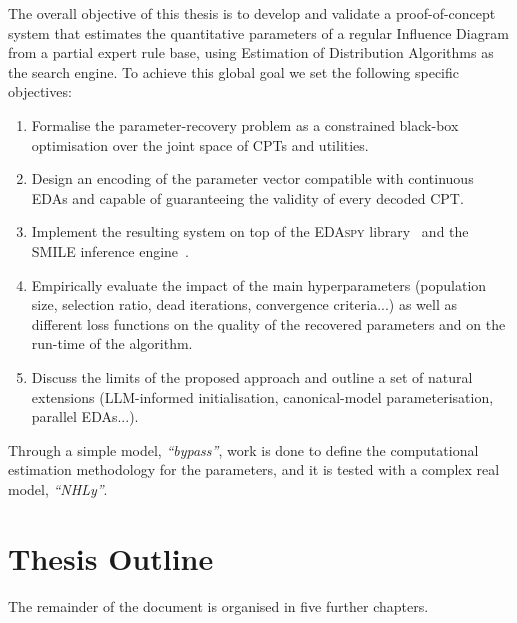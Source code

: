 The overall objective of this thesis is to develop and validate a
proof-of-concept system that estimates the quantitative parameters of
a regular Influence Diagram from a partial expert rule base, using
Estimation of Distribution Algorithms as the search engine. To
achieve this global goal we set the following specific objectives:
\begin{enumerate}
    \item Formalise the parameter-recovery problem as a constrained
          black-box optimisation over the joint space of CPTs and
          utilities.
    \item Design an encoding of the parameter vector compatible with
          continuous EDAs and capable of guaranteeing the validity of
          every decoded CPT.
    \item Implement the resulting system on top of the
          \textsc{EDAspy} library~\cite{soloviev2024edaspy} and the
          \textsc{SMILE} inference engine~\cite{genie}.
    \item Empirically evaluate the impact of the main
          hyperparameters (population size, selection ratio, dead iterations, convergence criteria...) as well as different loss functions on the quality of the recovered parameters and
          on the run-time of the algorithm.
    \item Discuss the limits of the proposed approach and outline a set of natural extensions (LLM-informed initialisation,
          canonical-model parameterisation, parallel EDAs...).
\end{enumerate}

Through a simple model, \emph{``bypass''}, work is done to define the computational estimation methodology for the parameters, and it is tested with a complex real model, \emph{``NHLy''}.

\section{Thesis Outline}

The remainder of the document is organised in five further chapters.

